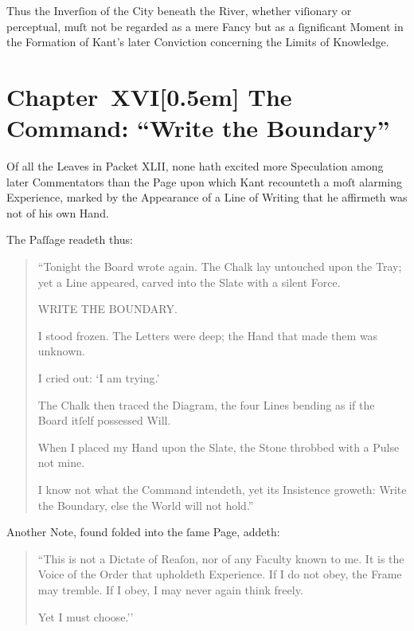 \documentclass[12pt]{book}
\begin{document}
Thus the Inverſion of the City beneath the River, whether viſionary or perceptual, muſt not be regarded as a mere Fancy but as a ſignificant Moment in the Formation of Kant’s later Conviction concerning the Limits of Knowledge.


\chapter*{Chapter~XVI[0.5em]
The Command: “Write the Boundary”}


Of all the Leaves in Packet XLII, none hath excited more Speculation among later Commentators than the Page upon which Kant recounteth a moſt alarming Experience, marked by the Appearance of a Line of Writing that he affirmeth was not of his own Hand.

The Paſſage readeth thus:

\begin{quote}
``Tonight the Board wrote again. The Chalk lay untouched upon the Tray; yet a Line appeared, carved into the Slate with a silent Force.

WRITE THE BOUNDARY.

I stood frozen. The Letters were deep; the Hand that made them was unknown.

I cried out: `I am trying.'

The Chalk then traced the Diagram, the four Lines bending as if the Board itſelf possessed Will.

When I placed my Hand upon the Slate, the Stone throbbed with a Pulse not mine.

I know not what the Command intendeth, yet its Insistence groweth: Write the Boundary, else the World will not hold.''
\end{quote}

Another Note, found folded into the ſame Page, addeth:

\begin{quote}
``This is not a Dictate of Reaſon, nor of any Faculty known to me. It is the Voice of the Order that upholdeth Experience. If I do not obey, the Frame may tremble. If I obey, I may never again think freely.

Yet I must choose.’’
\end{quote}
\end{document}
